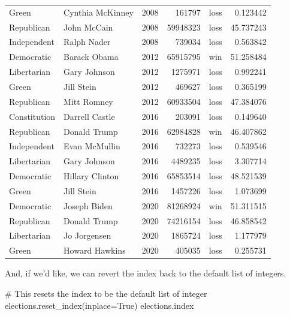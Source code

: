 \documentclass[
  letterpaper,
  DIV=11,
  numbers=noendperiod]{scrreprt}
\newenvironment{Shaded}{\begin{snugshade}}{\end{snugshade}}
\newcommand{\CommentTok}[1]{\textcolor[rgb]{0.37,0.37,0.37}{#1}}
\newcommand{\NormalTok}[1]{\textcolor[rgb]{0.00,0.23,0.31}{#1}}
\newcommand{\OperatorTok}[1]{\textcolor[rgb]{0.37,0.37,0.37}{#1}}
\newcommand{\VariableTok}[1]{\textcolor[rgb]{0.07,0.07,0.07}{#1}}
\begin{document}
\begin{tabular}{llrrlr}
Green                 &        Cynthia McKinney &  2008 &        161797 &   loss &   0.123442 \\
Republican            &             John McCain &  2008 &      59948323 &   loss &  45.737243 \\
Independent           &             Ralph Nader &  2008 &        739034 &   loss &   0.563842 \\
Democratic            &            Barack Obama &  2012 &      65915795 &    win &  51.258484 \\
Libertarian           &            Gary Johnson &  2012 &       1275971 &   loss &   0.992241 \\
Green                 &              Jill Stein &  2012 &        469627 &   loss &   0.365199 \\
Republican            &             Mitt Romney &  2012 &      60933504 &   loss &  47.384076 \\
Constitution          &          Darrell Castle &  2016 &        203091 &   loss &   0.149640 \\
Republican            &            Donald Trump &  2016 &      62984828 &    win &  46.407862 \\
Independent           &           Evan McMullin &  2016 &        732273 &   loss &   0.539546 \\
Libertarian           &            Gary Johnson &  2016 &       4489235 &   loss &   3.307714 \\
Democratic            &         Hillary Clinton &  2016 &      65853514 &   loss &  48.521539 \\
Green                 &              Jill Stein &  2016 &       1457226 &   loss &   1.073699 \\
Democratic            &            Joseph Biden &  2020 &      81268924 &    win &  51.311515 \\
Republican            &            Donald Trump &  2020 &      74216154 &   loss &  46.858542 \\
Libertarian           &            Jo Jorgensen &  2020 &       1865724 &   loss &   1.177979 \\
Green                 &          Howard Hawkins &  2020 &        405035 &   loss &   0.255731 \\
\bottomrule
\end{tabular}

And, if we'd like, we can revert the index back to the default list of
integers.

\begin{Shaded}
\begin{Highlighting}[]
\CommentTok{\# This resets the index to be the default list of integer}
\NormalTok{elections.reset\_index(inplace}\OperatorTok{=}\VariableTok{True}\NormalTok{) }
\NormalTok{elections.index}
\end{Highlighting}
\end{Shaded}
\end{document}
